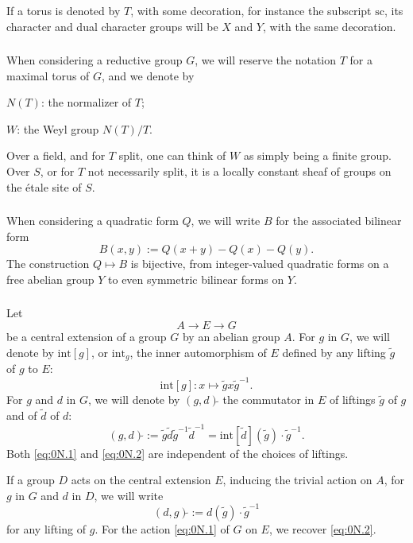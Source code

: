 \documentclass[11pt,a4paper]{article}
\theoremstyle{plain}
\theoremstyle{definition}
\newcommand{\scu}{\mathrm{sc}}
\newcommand{\intg}{\mathrm{int}}
\begin{document}
If a torus is denoted by $T$, with some decoration, for instance the subscript $\scu$, its character and dual character groups will be $X$ and $Y$, with the same decoration.

\subsubsection{}
When considering a reductive group $G$, we will reserve the notation $T$ for a maximal torus of $G$, and we denote by

$N(T)$: the normalizer of $T$;

$W$: the Weyl group $N(T)/T$.

Over a field, and for $T$ split, one can think of $W$ as simply being a finite group. Over $S$, or for $T$ not necessarily split, it is a locally constant sheaf of groups on the \'etale site of $S$.

\subsubsection{}
When considering a quadratic form $Q$, we will write $B$ for the associated bilinear form
\[B(x,y) := Q(x+y) - Q(x) - Q(y).\]
The construction $Q \mapsto B$ is bijective, from integer-valued quadratic forms on a free abelian group $Y$ to even symmetric bilinear forms on $Y$.

\subsubsection{}
Let
\[A \to E \to G\]
be a central extension of a group $G$ by an abelian group $A$. For $g$ in $G$, we will denote by $\intg[g]$, or $\intg_g$, the inner automorphism of $E$ defined by any lifting $\tilde{g}$ of $g$ to $E$:
\begin{equation}\label{eq:0N.1}
\intg[g]: x \mapsto \tilde{g} x \tilde{g}^{-1}.
\end{equation}
For $g$ and $d$ in $G$, we will denote by $(g,d)\tilde{}$ the commutator in $E$ of liftings $\tilde{g}$ of $g$ and of $\tilde{d}$ of $d$:
\begin{equation}\label{eq:0N.2}
(g,d)\tilde{} := \tilde{g}\tilde{d}\tilde{g}^{-1}\tilde{d}^{-1} = \intg[\tilde{d}](\tilde{g}) \cdot \tilde{g}^{-1}.
\end{equation}
Both \eqref{eq:0N.1} and \eqref{eq:0N.2} are independent of the choices of liftings.

If a group $D$ acts on the central extension $E$, inducing the trivial action on $A$, for $g$ in $G$ and $d$ in $D$, we will write
\begin{equation}\label{eq:0N.3}
(d,g)\tilde{} := d(\tilde{g}) \cdot \tilde{g}^{-1}
\end{equation}
for any lifting of $g$. For the action \eqref{eq:0N.1} of $G$ on $E$, we recover \eqref{eq:0N.2}.
\end{document}
